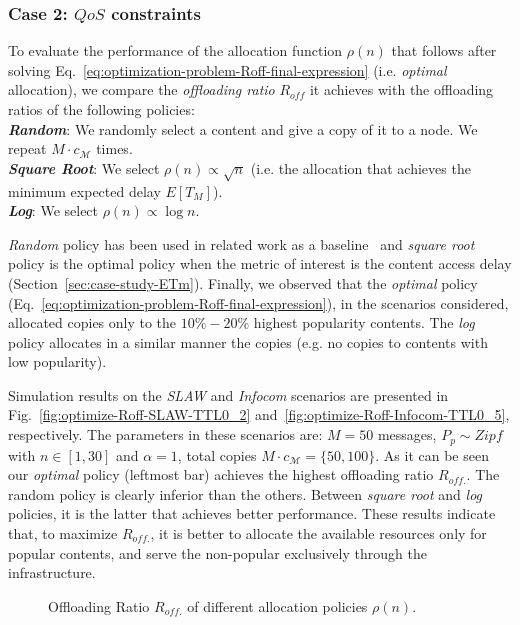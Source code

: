 \documentclass[journal]{IEEEtran}
\newcommand{\eq}[1]{Eq.~\eqref{#1}}
\begin{document}
\subsubsection{Case 2: $QoS$ constraints}
To evaluate the performance of the allocation function $\rho(n)$ that follows after solving \eq{eq:optimization-problem-Roff-final-expression} (i.e. \textit{optimal} allocation), we compare the \textit{offloading ratio} $R_{off}$ it achieves with the offloading ratios of the following policies:\\
\textit{\textbf{Random}}: We randomly select a content and give a copy of it to a node. We repeat $M\cdot c_{\mathcal{M}}$ times.\\
\textit{\textbf{Square Root}}: We select $\rho(n) \propto \sqrt{n}$ (i.e. the allocation that achieves the minimum expected delay $E[T_{M}]$).\\
\textit{\textbf{Log}}: We select $\rho(n) \propto \log{n}$.

\textit{Random} policy has been used in related work as a baseline~\cite{multiple-offloading} and \textit{square root} policy is the optimal policy when the metric of interest is the content access delay (Section~\ref{sec:case-study-ETm}). Finally, we observed that the \textit{optimal} policy (\eq{eq:optimization-problem-Roff-final-expression}), in the scenarios considered, allocated copies only to the $10\%-20\%$ highest popularity contents. The \textit{log} policy allocates in a similar manner the copies (e.g. no copies to contents with low popularity).


Simulation results on the \textit{SLAW} and \textit{Infocom} scenarios are presented in Fig.~\ref{fig:optimize-Roff-SLAW-TTL0_2} and~\ref{fig:optimize-Roff-Infocom-TTL0_5}, respectively. The parameters in these scenarios are: $M=50$ messages, $P_{p}\sim Zipf$ with $n\in[1,30]$ and $\alpha=1$, total copies $M\cdot c_{\mathcal{M}}=\{50 ,100\}$. As it can be seen our \textit{optimal} policy (leftmost bar) achieves the highest offloading ratio $R_{off.}$. The random policy is clearly inferior than the others. Between \textit{square root} and \textit{log} policies, it is the latter that achieves better performance. These results indicate that, to maximize $R_{off.}$, it is better to allocate the available resources only for popular contents, and serve the non-popular exclusively through the infrastructure.

\begin{figure}
\centering
{}
\caption{Offloading Ratio $R_{off.}$ of different allocation policies $\rho(n)$.}
\label{fig:optimize-Roff}
\end{figure}	
\end{document}
